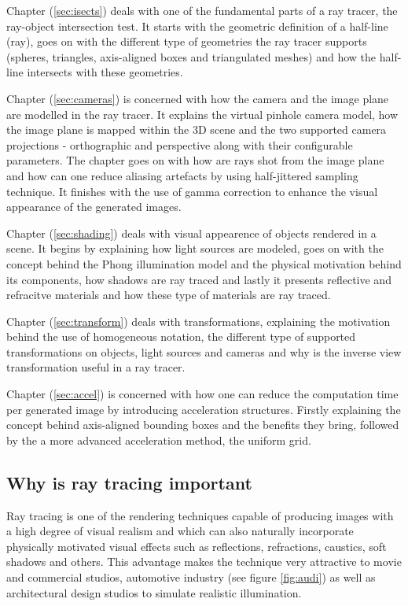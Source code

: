 \documentclass{article}
\begin{document}
Chapter (\ref{sec:isects}) deals with one of the fundamental parts of a ray tracer, the ray-object intersection test. It starts with the geometric definition of a half-line (ray), goes on with the different type of geometries the ray tracer supports (spheres, triangles, axis-aligned boxes and triangulated meshes) and how the half-line intersects with these geometries.

\vspace*{\baselineskip}

Chapter (\ref{sec:cameras}) is concerned with how the camera and the image plane are modelled in the ray tracer. It explains the virtual pinhole camera model, how the image plane is mapped within the 3D scene and the two supported camera projections - orthographic and perspective along with their configurable parameters. The chapter goes on with how are rays shot from the image plane and how can one reduce aliasing artefacts by using half-jittered sampling technique. It finishes with the use of gamma correction to enhance the visual appearance of the generated images. 

\vspace*{\baselineskip}

Chapter (\ref{sec:shading}) deals with visual appearence of objects rendered in a scene. It begins by explaining how light sources are modeled, goes on with the concept behind the Phong illumination model and the physical motivation behind its components, how shadows are ray traced and lastly it presents reflective and refracitve materials and how these type of materials are ray traced.

\vspace*{\baselineskip}

Chapter (\ref{sec:transform}) deals with transformations, explaining the motivation behind the use of homogeneous notation, the different type of supported transformations on objects, light sources and cameras and why is the inverse view transformation useful in a ray tracer.

\vspace*{\baselineskip}

Chapter (\ref{sec:accel}) is concerned with how one can reduce the computation time per generated image by introducing acceleration structures. Firstly explaining the concept behind axis-aligned bounding boxes and the benefits they bring, followed by the a more advanced acceleration method, the uniform grid.

\subsection{Why is ray tracing important}
Ray tracing is one of the rendering techniques capable of producing images with a high degree of visual realism and which can also naturally incorporate physically motivated visual effects such as reflections, refractions, caustics, soft shadows and others. This advantage makes the technique very attractive to movie and commercial studios, automotive industry (see figure \ref{fig:audi}) as well as architectural design studios to simulate realistic illumination.  
\end{document}
